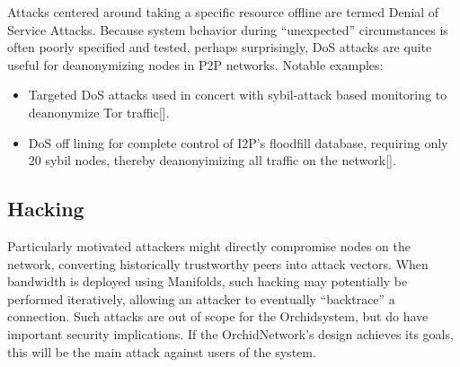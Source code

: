 \documentclass{article}
\newcommand{\orchid}{Orchid}
\newcommand{\Orchid}{\orchid}
\begin{document}
Attacks centered around taking a specific resource offline are termed Denial of Service Attacks. Because system behavior during “unexpected” circumstances is often poorly specified and tested, perhaps surprisingly, DoS attacks are quite useful for deanonymizing nodes in P2P networks. Notable examples:

\begin{itemize}
\item Targeted DoS attacks used in concert with sybil-attack based monitoring to deanonymize Tor traffic[\cite{DOSvsSec}].
\item DoS off lining for complete control of I2P’s floodfill database, requiring only 20 sybil nodes, thereby deanonyimizing all traffic on the network[\cite{I2P-vigna}].
\end{itemize}

\subsection{Hacking}

Particularly motivated attackers might directly compromise nodes on the network, converting historically trustworthy peers into attack vectors. When bandwidth is deployed using Manifolds, such hacking may potentially be performed iteratively, allowing an attacker to eventually ``backtrace'' a connection. Such attacks are out of scope for the \Orchid system, but do have important security implications. If the \Orchid Network's design achieves its goals, this will be the main attack against users of the system.





\end{document}
